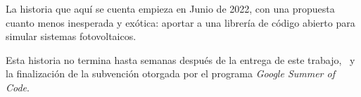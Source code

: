 \newpage

La historia que aquí se cuenta empieza en Junio de 2022, con una propuesta cuanto menos inesperada y exótica: aportar a una librería de código abierto para simular sistemas fotovoltaicos.

Esta historia no termina hasta semanas después de la entrega de este trabajo, \FechaLectura\ y la finalización de la subvención otorgada por el programa \textit{Google Summer of Code}.

\newpage

